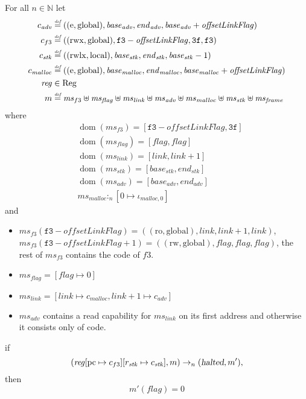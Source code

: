 \documentclass[a4paper]{article}
\newcommand{\update}[2]{[#1 \mapsto #2]}
\newcommand{\defeq}{\stackrel{\textit{\tiny{def}}}{=}}
\DeclareMathOperator{\dom}{dom}
\newcommand{\var}[1]{\mathit{#1}}
\newcommand{\hs}{\var{ms}}
\newcommand{\ms}{\hs}
\newcommand{\pcreg}{\mathrm{pc}}
\newcommand{\start}{\var{base}}
\newcommand{\addrend}{\var{end}}
\newcommand{\reg}{\var{reg}}
\newcommand{\heap}{\var{mem}}
\newcommand{\adv}{\var{adv}}
\newcommand{\link}{\var{link}}
\newcommand{\stk}{\var{stk}}
\newcommand{\flag}{\var{flag}}
\newcommand{\olf}{\var{offsetLinkFlag}}
\newcommand{\halted}{\textsl{halted}}
\newcommand{\heapSat}[3][\heap]{#1 :_{#2} #3}
\newcommand{\codelabel}[1]{\mathit{#1}}
\newcommand{\malloc}{\codelabel{malloc}}
\newcommand{\plaindom}[1]{\mathrm{#1}}
\newcommand{\Regs}{\plaindom{Reg}}
\newcommand{\nats}{\mathbb{N}}
\newcommand{\plainperm}[1]{\mathrm{#1}}
\newcommand{\readonly}{\plainperm{ro}}
\newcommand{\readwrite}{\plainperm{rw}}
\newcommand{\entry}{\plainperm{e}}
\newcommand{\rwx}{\plainperm{rwx}}
\newcommand{\rwlx}{\plainperm{rwlx}}
\newcommand{\local}{\plainperm{local}}
\newcommand{\glob}{\plainperm{global}}
\newcommand{\step}[1][]{\rightarrow_{#1}}
\begin{document}
\begin{lemma}
  \label{lem:correctness-f3}
  For all $n \in \nats$
  let
  \begin{align*}
    c_{\var{adv}} & \defeq ((\entry,\glob),\start_{\adv},\addrend_{\adv},\start_{\adv}+\olf) \\
    c_{f3} & \defeq ((\rwx,\glob),\mathtt{f3}-\olf,\mathtt{3f},\mathtt{f3}) \\
    c_{\var{stk}} & \defeq ((\rwlx,\local),\start_\stk,\addrend_\stk,\start_\stk-1) \\
    c_\malloc & \defeq ((\entry,\glob),\start_\malloc,\addrend_\malloc,\start_\malloc+\olf) \\
    \reg & \in \Regs \\
    m & \defeq \hs_{f3} \uplus 
        \hs_\flag \uplus                
        \ms_{\var{link}} \uplus 
        \hs_\adv \uplus 
        \ms_{\malloc} \uplus 
        \ms_{\var{stk}} \uplus
        \ms_{\var{frame}} 
  \end{align*}
  where 
  \begin{align*}
    &\dom(\hs_{f3}) = [\mathtt{f3}-\olf,\mathtt{3f}] \\
    &\dom(\hs_\flag) = [\flag,\flag] \\
    &\dom(\ms_\link) = [\link,\link+1]\\
    &\dom(\ms_\stk) = [\start_\stk, \addrend_\stk]\\
    &\dom(\hs_{\adv}) = [\start_\adv,\addrend_\adv] \\
    &\heapSat[\hs_{\malloc}]{n}{[0 \mapsto \iota_{\malloc,0}]}
  \end{align*}
  and
  \begin{itemize}
  \item $\ms_{f3}(\mathtt{f3}-\olf) = ((\readonly,\glob),\link,\link+1,\link)$, $\ms_{f3}(\mathtt{f3}-\olf+1) = ((\readwrite,\glob),\flag,\flag,\flag)$, the rest of $\hs_{f3}$ contains the code of $f3$.
  \item $\ms_\flag = [\flag \mapsto 0]$
  \item $\ms_{\var{link}} = [\var{link} \mapsto c_\malloc, \var{link} + 1 \mapsto c_\adv]$
  \item $\hs_\adv$ contains a read capability for $\hs_\link$ on its first address and otherwise it consists only of code.
  \end{itemize}
  if 
  \[
    (\reg\update{\pcreg}{c_{f3}}\update{r_\stk}{c_\stk},m) \step[n] (\halted,m'),
  \]
  then
  \[
    m'(\flag) = 0
  \]  
\end{lemma}
\end{document}
